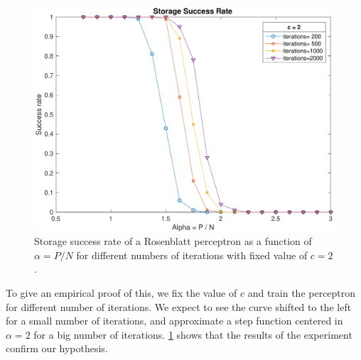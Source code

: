 \begin{figure}[t]
	\centering
	\includegraphics[width=\columnwidth]{figures/bonus_2_epoch}
    \caption{Storage success rate of a Rosenblatt perceptron as a function of $\alpha = P / N$ for different numbers of iterations with fixed value of $c=2$.}
	\label{fig:fixed_c_multiple_epoch}
\end{figure}
To give an empirical proof of this, we fix the value of $c$ and train the perceptron for different number of iterations.
We expect to see the curve shifted to the left for a small number of iterations, and approximate a step function centered in $\alpha = 2$ for a big number of iterations.
\cref{fig:fixed_c_multiple_epoch} shows that the results of the experiment confirm our hypothesis.

